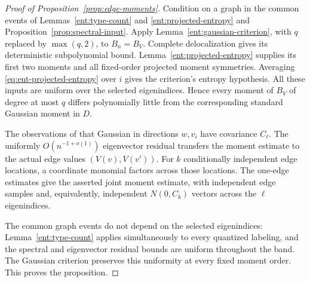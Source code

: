 \begin{proof}[Proof of Proposition~\ref{prop:edge-moments}]
Condition on a graph in the common events of
Lemmas~\ref{ent:type-count} and \ref{ent:projected-entropy} and
Proposition~\ref{prop:spectral-input}. Apply
Lemma~\ref{ent:gaussian-criterion}, with \(q\) replaced by
\(\max(q,2)\), to \(B_n=B_V\).
Complete delocalization gives its deterministic subpolynomial bound.
Lemma~\ref{ent:projected-entropy} supplies its first two moments and
all fixed-order projected moment symmetries. Averaging
\eqref{eq:ent-projected-entropy} over \(i\) gives the criterion's
entropy hypothesis. All these inputs are uniform over the selected
eigenindices. Hence every moment of \(B_V\) of degree at most \(q\)
differs polynomially little from the corresponding standard Gaussian moment
in \(D\).

The observations of that Gaussian in directions \(w,v_i\) have
covariance \(C_\ell\). The uniformly \(O(n^{-1+o(1)})\) eigenvector
residual transfers the moment estimate to the actual edge values
\((V(v),V(v'))\). For \(k\) conditionally independent edge locations,
a coordinate monomial factors across those locations. The one-edge
estimates give the asserted joint moment estimate, with independent
edge samples and, equivalently, independent \(N(0,C_k)\) vectors
across the \(\ell\) eigenindices.

The common graph events do not depend on the selected eigenindices:
Lemma~\ref{ent:type-count} applies simultaneously to every quantized
labeling, and the spectral and eigenvector residual bounds are
uniform throughout the band. The Gaussian criterion preserves this
uniformity at every fixed moment order. This proves the proposition.
\end{proof}

